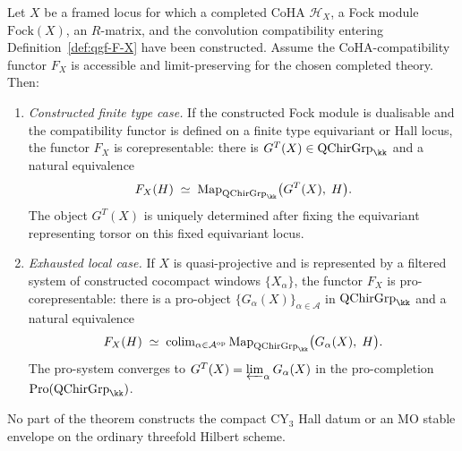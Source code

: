 \begin{theorem}
\label{thm:qgf-G-X-representability}
Let \(X\) be a framed locus for which a completed CoHA
\(\mathcal H_X\), a Fock module \(\mathrm{Fock}(X)\), an \(R\)-matrix,
and the convolution compatibility entering Definition~\ref{def:qgf-F-X}
have been constructed. Assume the CoHA-compatibility functor \(F_X\) is
accessible and limit-preserving for the chosen completed theory. Then:
\begin{enumerate}[label=\textup{(\roman*)}]
 \item \emph{Constructed finite type case.} If the constructed Fock
 module is dualisable and the compatibility functor is defined on a
 finite type equivariant or Hall locus, the functor \(F_X\) is
 corepresentable: there is \(G^{T}(X) \in \mathrm{QChirGrp}_\kk\) and a natural equivalence
 \[
 F_X(H) \;\simeq\; \mathrm{Map}_{\mathrm{QChirGrp}_\kk}\bigl(G^{T}(X),\; H\bigr).
 \]
 The object $G^{T}(X)$ is uniquely determined after fixing the
 equivariant representing torsor on this fixed equivariant locus.
 \item \emph{Exhausted local case.} If \(X\) is quasi-projective and is
 represented by a filtered system of constructed cocompact windows
 \(\{X_\alpha\}\), the functor \(F_X\) is pro-corepresentable: there is a pro-object $\{G_\alpha(X)\}_{\alpha \in \mathcal A}$ in $\mathrm{QChirGrp}_\kk$ and a natural equivalence
 \[
 F_X(H) \;\simeq\; \mathrm{colim}_{\alpha \in \mathcal A^{\mathrm{op}}}\,\mathrm{Map}_{\mathrm{QChirGrp}_\kk}\bigl(G_\alpha(X),\; H\bigr).
 \]
 The pro-system converges to \(G^{T}(X)=\varprojlim_\alpha G_\alpha(X)\)
 in the pro-completion \(\mathrm{Pro}(\mathrm{QChirGrp}_\kk)\).
\end{enumerate}
No part of the theorem constructs the compact CY$_3$ Hall datum or an
MO stable envelope on the ordinary threefold Hilbert scheme.
\end{theorem}

